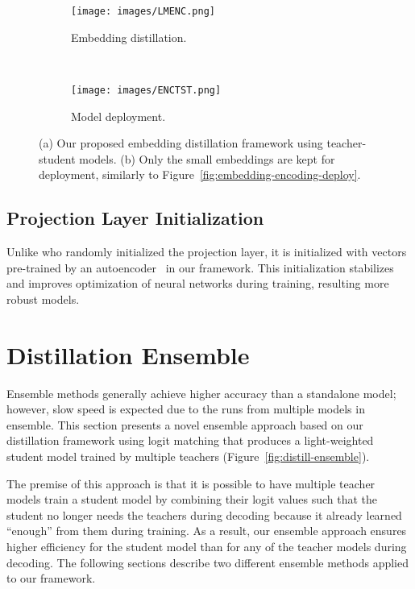 \documentclass{article}
\begin{document}
\begin{figure}[htbp!]
    \centering
   	\begin{subfigure}[b]{0.23\textwidth}
   		\centering
\texttt{[image: images/LMENC.png]}
   		\caption{Embedding distillation.}
   		\label{fig:embedding-distill}
   	\end{subfigure}~ 
   	\begin{subfigure}[b]{0.23\textwidth}
   		\centering
\texttt{[image: images/ENCTST.png]}
   		\caption{Model deployment.}
   		\label{fig:embedding-deploy}
   	\end{subfigure}\caption{(a) Our proposed embedding distillation framework using teacher-student models.
             (b) Only the small embeddings are kept for deployment, similarly to Figure~\ref{fig:embedding-encoding-deploy}.}
         	\vspace{-2ex}
	\label{fig:lm}
\end{figure}


\subsection{Projection Layer Initialization}
\label{ssec:encoding}

Unlike \cite{mou2016distilling} who randomly initialized the projection layer, it is initialized with vectors pre-trained by an autoencoder~\cite{hinton1994autoencoders} in our framework.
This initialization stabilizes and improves optimization of neural networks during training, resulting more robust models.








 \section{Distillation Ensemble}
\label{sec:ensemble}

Ensemble methods generally achieve higher accuracy than a standalone model; however, slow speed is expected due to the runs from multiple models in ensemble.
This section presents a novel ensemble approach based on our distillation framework using logit matching that produces a light-weighted student model trained by multiple teachers (Figure~\ref{fig:distill-ensemble}).

The premise of this approach is that it is possible to have multiple teacher models train a student model by combining their logit values such that the student no longer needs the teachers during decoding because it already learned ``enough'' from them during training.
As a result, our ensemble approach ensures higher efficiency for the student model than for any of the teacher models during decoding.
The following sections describe two different ensemble methods applied to our framework.
\end{document}

